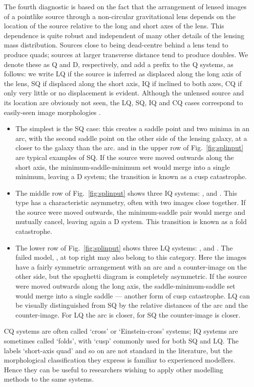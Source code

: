 The fourth diagnostic is based on the fact that the arrangement of
lensed images of a pointlike source through a non-circular
gravitational lens depends on the location of the source relative to
the long and short axes of the lens.  This dependence is quite robust
and independent of many other details of the lensing mass
distribution.  Sources close to being dead-centre behind a lens tend
to produce quads; sources at larger transverse distance tend to
produce doubles.  We denote these as Q and D, respectively, and add a
prefix to the Q systems, as follows: we write LQ if the source is
inferred as displaced along the long axis of the lens, SQ if displaced
along the short axis, IQ if inclined to both axes, CQ if only very little or
no displacement is evident.  Although the
unlensed source and its location are obviously not seen, the LQ, SQ, IQ and CQ
cases correspond to easily-seen image morphologies \citep[see,
  e.g.,][]{2003AJ....125.2769S}.
\begin{itemize}
\item The simplest is the SQ case: this creates a saddle point and two
  minima in an arc, with the second saddle point on the other side of
  the lensing galaxy, at a closer to the galaxy than the arc.  
  and  in the upper row of Fig.~\ref{fig:splinput} are typical
  examples of SQ.  If the source were moved outwards along the short
  axis, the minimum-saddle-minimum set would merge into a single minimum,
  leaving a D system; the transition is known as a cusp catastrophe.
\item The middle row of Fig.~\ref{fig:splinput} shows three IQ
  systems: ,  and .  This type has a characteristic
  asymmetry, often with two images close together.  If the source
  were moved outwards, the minimum-saddle pair would merge and
  mutually cancel, leaving again a D system. This transition is known
  as a fold catastrophe.
\item The lower row of Fig.~\ref{fig:splinput} shows three LQ
  systems: ,  and . The failed model, , at top right
  may also belong to this category.  Here the images have a
  fairly symmetric arrangement with an arc and a counter-image on the
  other side, but the spaghetti diagram is completely asymmetric.  If
  the source were moved outwards along the long axis, the
  saddle-minimum-saddle set  would merge into a single saddle --- another
  form of cusp catastrophe.  LQ can be visually distinguished from SQ
  by the relative distances of the arc and the counter-image.  For
  LQ the arc is closer, for SQ the counter-image is closer.
\end{itemize}
CQ systems are often called `cross' or `Einstein-cross' systems; IQ
systems are sometimes called `folds', with `cusp' commonly used for
both SQ and LQ.  The labels `short-axis quad' and so on are not
standard in the literature, but the morphological classification they
express is familiar to experienced modellers.  Hence they can be
useful to researchers wishing to apply other modelling methods to the
same systems.

